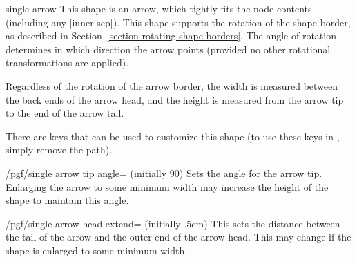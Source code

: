 \begin{shape}{single arrow}
	This shape is an arrow, which tightly fits the node contents
	(including any |inner sep|).
	This shape supports the rotation of the shape border, as
	described in Section~\ref{section-rotating-shape-borders}.
	The angle of rotation determines in which direction the arrow
	points (provided no other rotational transformations are applied).
	
\begin{codeexample}[]
\end{codeexample}

	Regardless of the rotation of the arrow border, the width is
  measured between the back ends of the arrow head, and the
  height is measured from the arrow tip to the end of the arrow
  tail.

\begin{codeexample}[]
\end{codeexample}

	There are \pgfname{} keys that can be used to customize this shape (to
	use these keys in \tikzname{}, simply remove the 
	path).
	
\begin{key}{/pgf/single arrow tip angle= (initially 90)}
  Sets the angle for the arrow tip. Enlarging the arrow to some
  minimum width may increase the height of the shape to maintain
  this angle.
\end{key}

\begin{key}{/pgf/single arrow head extend= (initially .5cm)}
  This sets the distance between the tail of the arrow and the outer
  end of the arrow head. This may change if the shape is enlarged to
  some minimum width.


\end{key}
\end{shape}
